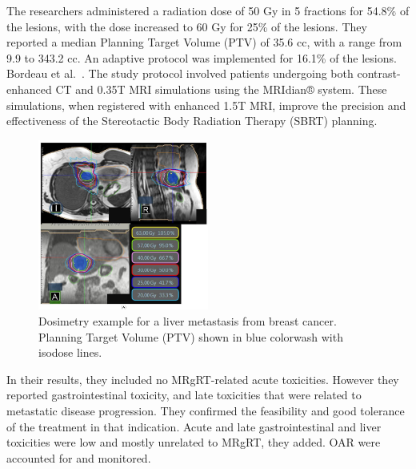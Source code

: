 The researchers administered a radiation dose of 50 Gy in 5 fractions for 54.8\% of the lesions, with the dose increased to 60 Gy for 25\% of the lesions. They reported a median Planning Target Volume (PTV) of 35.6 cc, with a range from 9.9 to 343.2 cc. An adaptive protocol was implemented for 16.1\% of the lesions. Bordeau et al.~\cite{bordeau2023}. The study protocol involved patients undergoing both contrast-enhanced CT and 0.35T MRI simulations using the MRIdian® system. These simulations, when registered with enhanced 1.5T MRI, improve the precision and effectiveness of the Stereotactic Body Radiation Therapy (SBRT) planning.


\begin{figure}[ht]
	\centering
	\includegraphics[width=0.5\textwidth]{assets/MRISBRT.jpeg}
	\caption{Dosimetry example for a liver metastasis from breast cancer. Planning Target Volume (PTV) shown in blue colorwash with isodose lines.}
	\label{fig:liver-metastasis-dosimetry}
\end{figure}

In their results, they included no MRgRT-related acute toxicities. However they reported gastrointestinal toxicity, and late toxicities that were related to metastatic disease progression. They confirmed the feasibility and good tolerance of the treatment in that indication. Acute and late gastrointestinal and liver toxicities were low and mostly unrelated to MRgRT, they added. OAR were accounted for and monitored. 
